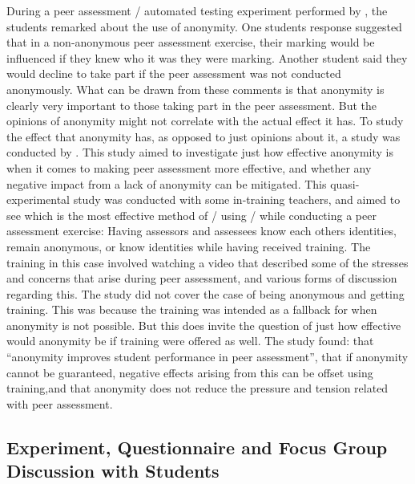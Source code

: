 \documentclass[sigplan,10pt,review]{acmart}\settopmatter{printfolios=true}
\begin{document}
During a peer assessment / automated testing experiment performed by
\citet{sitthiworachart_effective_2004}, the students remarked about
the use of anonymity. One students response suggested that in a
non-anonymous peer assessment exercise, their marking would be
influenced if they knew who it was they were marking. Another student
said they would decline to take part if the peer assessment was not
conducted anonymously. What can be drawn from these comments is that
anonymity is clearly very important to those taking part in the peer
assessment. But the opinions of anonymity might not correlate with the
actual effect it has.
%
To study the effect that anonymity has, as opposed to just opinions
about it, a study was conducted by \citet{li_role_2016}. This study
aimed to investigate just how effective anonymity is when it comes to
making peer assessment more effective, and whether any negative impact
from a lack of anonymity can be mitigated.
%
This quasi-experimental study was conducted with some in-training
teachers, and aimed to see which is the most effective method of /
using / while conducting a peer assessment exercise: Having assessors
and assessees know each others identities, remain anonymous, or know
identities while having received training. The training in this case
involved watching a video that described some of the stresses and
concerns that arise during peer assessment, and various forms of
discussion regarding this.
%
The study did not cover the case of being anonymous and getting
training. This was because the training was intended as a fallback for
when anonymity is not possible. But this does invite the question of
just how effective would anonymity be if training were offered as
well.
%
The study found: that ``anonymity improves student performance in peer
assessment'', that if anonymity cannot be guaranteed, negative effects
arising from this can be offset using training,and that anonymity does
not reduce the pressure and tension related with peer assessment.

\subsection{Experiment, Questionnaire and Focus Group Discussion with Students}
\label{sec:student-requirements}
\end{document}
